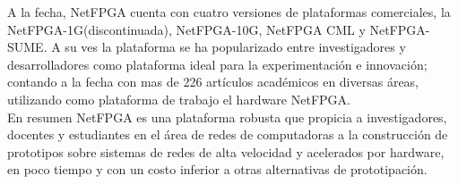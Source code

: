 A la fecha, NetFPGA cuenta con cuatro versiones de plataformas comerciales, la NetFPGA-1G(discontinuada), NetFPGA-10G, NetFPGA CML y NetFPGA-SUME. A su ves la plataforma se ha popularizado entre investigadores y desarrolladores como plataforma ideal para la experimentación e innovación; contando a la fecha con mas de 226 artículos académicos\cite{NetFPGA4} en diversas áreas, utilizando como plataforma de trabajo el hardware NetFPGA.\\

En resumen NetFPGA es una plataforma robusta que propicia a investigadores, docentes y estudiantes en el área de redes de computadoras a la construcción de prototipos sobre sistemas de redes de alta velocidad y acelerados por hardware, en poco tiempo y con un costo inferior a otras alternativas de prototipaci\'on.



